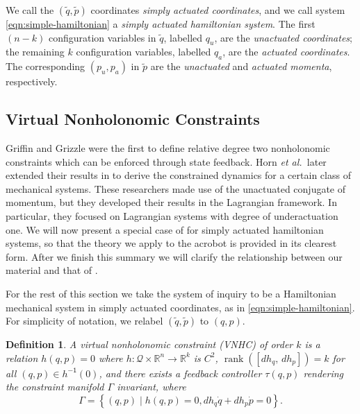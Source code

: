 \documentclass[journal,twoside,web, onecolumn, draftcls]{ieeecolor}
\newtheorem{defn}{Definition} %
\DeclareMathOperator{\Rank}{rank}
\newcommand*{\rank}[1]{\Rank\left(#1\right)}
\newcommand*{\inv}{^\mathsf{-1}}
\newcommand*{\R}{\mathbb{R}}
\newcommand*{\etal}{\MakeLowercase{\textit{et al.~}}}
\begin{document}
We call the \((\tilde{q},\tilde{p})\) coordinates
\textit{simply actuated coordinates}, and we call system
\eqref{eqn:simple-hamiltonian} a \textit{simply actuated hamiltonian system}.
The first \((n-k)\) configuration variables in \(\tilde{q}\), labelled \(q_u\),
are the \textit{unactuated coordinates}; 
the remaining \(k\) configuration variables, labelled \(q_a\), are the
\textit{actuated coordinates}.
The corresponding \((p_u, p_a)\) in \(\tilde{p}\) are the \textit{unactuated}
and \textit{actuated momenta}, respectively.

\subsection{Virtual Nonholonomic Constraints}\label{sec:vnhc-vnhc}

Griffin and Grizzle \cite{nhvc_dynamic_walking} were the first to define
relative degree two nonholonomic constraints which can be enforced
through state feedback.
Horn \etal later extended their results in
\cite{hybrid_zero_dynamics_bipedal_nhvcs} to derive the constrained dynamics for
a certain class of mechanical systems.
These researchers made use of the unactuated conjugate of momentum, but they
developed their results in the Lagrangian framework.
In particular, they focused on Lagrangian systems with degree of underactuation
one.
We will now present a special case of \cite{hybrid_zero_dynamics_bipedal_nhvcs}
for simply actuated hamiltonian systems, so that the theory we apply to the
acrobot is provided in its clearest form.
After we finish this summary we will clarify the relationship between our
material and that of \cite{hybrid_zero_dynamics_bipedal_nhvcs}.

For the rest of this section we take the system of inquiry to be a
Hamiltonian mechanical system in simply actuated coordinates, as in
\eqref{eqn:simple-hamiltonian}.
For simplicity of notation, we relabel \((\tilde{q},\tilde{p})\) to \((q,p)\).

\begin{defn}\label{defn:vnhc}
    A \textit{virtual nonholonomic constraint} (VNHC) \textit{of order \(k\)} is a
    relation \(h(q,p) = 0\) where \(h : \mathcal{Q}\times\R^n \rightarrow \R^k\) is
    \(C^2\), \(\rank{\left[ dh_q,\, dh_p \right]} = k\) for all 
    \((q,p) \in h\inv(0)\), and there exists a feedback controller \(\tau(q,p)\)
    rendering the \textit{constraint manifold} \(\Gamma\) invariant,
    where
    \begin{equation}
        \Gamma = \left\{(q,p) \mid h(q,p) = 0, dh_q \dot{q} + dh_p \dot{p} = 0\right\}
        .
    \end{equation}
\end{defn}
\end{document}
